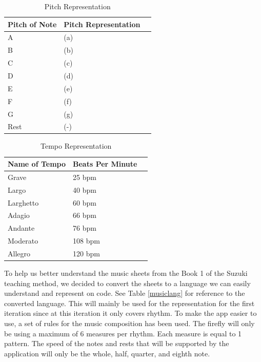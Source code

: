 \begin{table}[H]
\caption{Pitch Representation}
\label{pitchRep}
\centering
\begin{tabular}{|l|l|r|} 
\hline
Pitch of Note & Pitch Representation   \\ 
\hline
A                   & (a)                     \\ 
\hline
B                   & (b)                      \\ 
\hline
C                   & (c)                      \\ 
\hline
D                   & (d)                    \\ 
\hline
E                   & (e)                      \\ 
\hline
F                   & (f)                       \\ 
\hline
G                   & (g)                    \\ 
\hline
Rest                   & (-)                    \\ 
\hline
\end{tabular}
\end{table}

\begin{table}[H]
\caption{Tempo Representation}
\label{pitchRep}
\centering
\begin{tabular}{|l|l|r|} 
\hline
Name of Tempo & Beats Per Minute   \\ 
\hline
Grave                  & 25 bpm                     \\ 
\hline
Largo                  & 40 bpm                      \\ 
\hline
Larghetto                  & 60 bpm                      \\ 
\hline
Adagio                  & 66 bpm                    \\ 
\hline
Andante                   & 76 bpm                      \\ 
\hline
Moderato                   & 108 bpm                       \\ 
\hline
Allegro                  & 120 bpm                    \\ 
\hline
\end{tabular}
\end{table}

To help us better understand the music sheets from the Book 1 of the Suzuki teaching method, we decided to convert the sheets to a language we can easily understand and represent on code. See Table \ref{musiclang} for reference to the converted language. This will mainly be used for the representation for the first iteration since at this iteration it only covers rhythm. To make the app easier to use, a set of rules for the music composition has been used. The firefly will only be using a maximum of 6 measures per rhythm. Each measure is equal to 1 pattern. The speed of the notes and rests that will be supported by the application will only be the whole, half, quarter, and eighth note.


